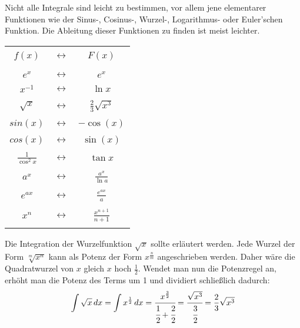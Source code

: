 \pagebreak


Nicht alle Integrale sind leicht zu bestimmen, vor allem jene elementarer Funktionen wie der Sinus-, Cosinus-, Wurzel-, Logarithmus- oder Euler'schen Funktion. Die Ableitung dieser Funktionen zu finden ist meist leichter.

\vspace{\parskip}

\begin{table}[h!]
	\centering
	\large
	\begin{tabular}{| c c c |}
		\hline
		&& \\
		$f(x)$ & $\longleftrightarrow$ & $F(x)$
		\\ && \\ \hline && \\
		$e^x$ & $\longleftrightarrow$ & $e^x$
		\\ && \\
		$x^{-1}$ & $\longleftrightarrow$ & $\ln x$
		\\ && \\
		$\sqrt{x}$ & $\longleftrightarrow$ & $\frac{2}{3}\sqrt{x^3}$
		\\ && \\
		$sin(x)$ & $\longleftrightarrow$ & $-\cos(x)$
		\\ && \\
		$cos(x)$ & $\longleftrightarrow$ & $\sin(x)$
		\\ && \\
		$\frac{1}{\cos^2 x}$ & $\longleftrightarrow$ & $\tan x$
		\\ && \\
		$a^x$ & $\longleftrightarrow$ & $\frac{a^x}{\ln a}$
		\\ && \\
		$e^{ax}$ & $\longleftrightarrow$ & $\frac{e^{ax}}{a}$
		\\ && \\
		$x^n$ & $\longleftrightarrow$ & $\frac{x^{n + 1}}{n + 1}$
		\\ && \\
		\hline
	\end{tabular}
\end{table}

\vspace{\parskip}

Die Integration der Wurzelfunktion $\sqrt{x}$ sollte erl\"{a}utert werden. Jede Wurzel der Form $\sqrt[m]{x^n}$ kann als Potenz der Form $x^{\frac{n}{m}}$ angeschrieben werden. Daher w\"{a}re die Quadratwurzel von $x$ gleich $x$ hoch $\frac{1}{2}$. Wendet man nun die Potenzregel an, erh\"{o}ht man die Potenz des Terms um 1 und dividiert schlie\ss{}lich dadurch: $$\int \sqrt{x} \,dx = \int x^{\frac{1}{2}} \,dx = \cfrac{x^{\frac{3}{2}}}{\cfrac{1}{2} + \cfrac{2}{2}} = \cfrac{\sqrt{x^3}}{\cfrac{3}{2}} = \frac{2}{3} \sqrt{x^3}$$

\pagebreak




